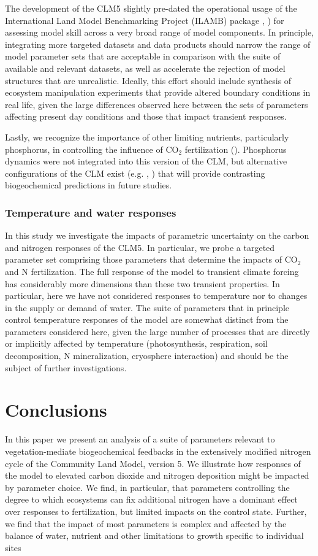 \usepackage{}\documentclass[draft,linenumbers]{agujournal}
\begin{document}
The development of the CLM5 slightly pre-dated the operational usage of the International Land Model Benchmarking Project (ILAMB) package \cite{collier2018}, \cite{lawrence2018}) for assessing model skill across a very broad range of model components.  In principle, integrating more targeted datasets and data products should narrow the range of model parameter sets that are acceptable in comparison with the suite of available and relevant datasets, as well as accelerate the rejection of model structures that are unrealistic. Ideally, this effort should include synthesis of ecosystem manipulation experiments that provide altered boundary conditions in real life, given the large differences observed here between the sets of parameters affecting present day conditions and those that impact transient responses.

Lastly, we recognize the importance of other limiting nutrients, particularly phosphorus, in controlling the influence of CO$_{2}$ fertilization (\cite{reed2015}). Phosphorus dynamics were not integrated into this version of the CLM, but alternative configurations of the CLM exist (e.g. \cite{yang2014}, \cite{zhu2016}) that will provide contrasting biogeochemical predictions in future studies.  

\subsubsection{Temperature and water responses}
In this study we investigate the impacts of parametric uncertainty on the carbon and nitrogen responses of the CLM5. In particular, we probe a targeted parameter set comprising those parameters that determine the impacts of CO$_{2}$ and N fertilization. The full response of the model to transient climate forcing has considerably more dimensions than these two transient properties. In particular, here we have not considered responses to temperature nor to changes in the supply or demand of water. The suite of parameters that in principle control temperature responses of the model are somewhat distinct from the parameters considered here, given the large number of processes that are directly or implicitly affected by temperature (photosynthesis, respiration, soil decomposition, N mineralization, cryosphere interaction) and should be the subject of further investigations. 

\section{Conclusions}
In this paper we present an analysis of a suite of parameters relevant to vegetation-mediate biogeochemical feedbacks in the extensively modified nitrogen cycle of the Community Land Model, version 5. We illustrate how responses of the model to elevated carbon dioxide and nitrogen deposition might be impacted by parameter choice. We find, in particular, that parameters controlling the degree to which ecosystems can fix additional nitrogen have a dominant effect over responses to fertilization, but limited impacts on the control state. Further, we find that the impact of most parameters is complex and affected by the balance of water, nutrient and other limitations to growth specific to individual sites
\end{document}
